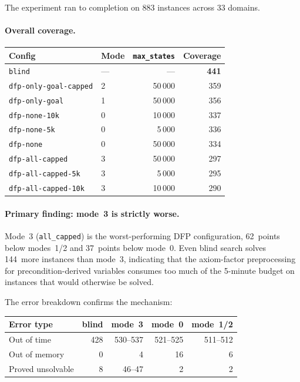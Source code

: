 \documentclass[11pt,a4paper]{article}
\begin{document}
The experiment ran to completion on 883 instances across 33 domains.

\paragraph{Overall coverage.}

\begin{center}
\small
\begin{tabular}{llrr}
\toprule
\textbf{Config} & \textbf{Mode} & \textbf{\texttt{max\_states}} & \textbf{Coverage} \\
\midrule
\texttt{blind}                 & ---    & ---    & \textbf{441} \\
\texttt{dfp-only-goal-capped}  & 2      & 50\,000 & 359 \\
\texttt{dfp-only-goal}         & 1      & 50\,000 & 356 \\
\texttt{dfp-none-10k}          & 0      & 10\,000 & 337 \\
\texttt{dfp-none-5k}           & 0      & 5\,000  & 336 \\
\texttt{dfp-none}              & 0      & 50\,000 & 334 \\
\texttt{dfp-all-capped}        & 3      & 50\,000 & 297 \\
\texttt{dfp-all-capped-5k}     & 3      & 5\,000  & 295 \\
\texttt{dfp-all-capped-10k}    & 3      & 10\,000 & 290 \\
\bottomrule
\end{tabular}
\end{center}

\paragraph{Primary finding: mode~3 is strictly worse.}
Mode~3 (\texttt{all\_capped}) is the worst-performing DFP configuration,
62~points below modes~1/2 and 37~points below mode~0.  Even blind search
solves 144~more instances than mode~3, indicating that the axiom-factor
preprocessing for precondition-derived variables consumes too much of the
5-minute budget on instances that would otherwise be solved.

The error breakdown confirms the mechanism:

\begin{center}
\small
\begin{tabular}{lrrrr}
\toprule
\textbf{Error type} & \textbf{blind} & \textbf{mode~3} & \textbf{mode~0} & \textbf{mode~1/2} \\
\midrule
Out of time   & 428 & 530--537 & 521--525 & 511--512 \\
Out of memory & 0   & 4        & 16       & 6        \\
Proved unsolvable & 8 & 46--47 & 2        & 2        \\
\bottomrule
\end{tabular}
\end{center}
\end{document}
